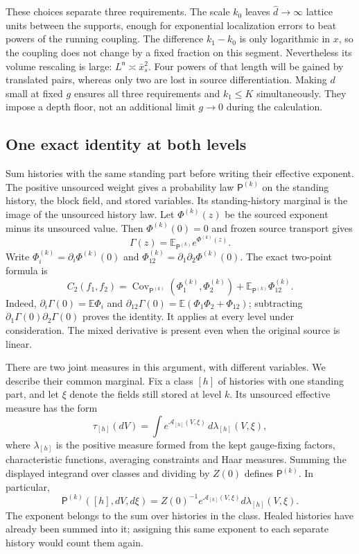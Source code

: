 \documentclass[11pt,letterpaper,reqno]{amsart}
\theoremstyle{definition}
\theoremstyle{remark}
\begin{document}
These choices separate three requirements. The scale $k_0$ leaves
$\hat d\to\infty$ lattice units between the supports, enough for
exponential localization errors to beat powers of the running coupling.
The difference $k_1-k_0$ is only logarithmic in $x$, so the coupling
does not change by a fixed fraction on this segment. Nevertheless its
volume rescaling is large: $L^{\mathsf n}\asymp\bar x_s^2$.
Four powers of that length will be gained by translated pairs, whereas
only two are lost in source differentiation. Making $d$ small at fixed
$g$ ensures all three requirements and $k_1\le K$ simultaneously.
They impose a depth floor, not an additional limit $g\to0$ during
the calculation.

\subsection{One exact identity at both levels}

Sum histories with the same standing part before writing their effective
exponent. The positive unsourced weight gives a probability law
$\mathsf P^{(k)}$ on the standing history, the block field, and stored
variables. Its standing-history marginal is the image of the unsourced
history law. Let $\Phi^{(k)}(z)$ be the sourced exponent minus its
unsourced value. Then $\Phi^{(k)}(0)=0$ and frozen source transport gives
\[
 \Gamma(z)=\mathbb E_{\mathsf P^{(k)}}e^{\Phi^{(k)}(z)}.
\]
Write $\Phi_i^{(k)}=\partial_i\Phi^{(k)}(0)$ and
$\Phi_{12}^{(k)}=\partial_1\partial_2\Phi^{(k)}(0)$.
The exact two-point formula is
\begin{equation}\label{eq:witness-exact-identity}
 C_2(f_1,f_2)
  =\operatorname{Cov}_{\mathsf P^{(k)}}
                   (\Phi_1^{(k)},\Phi_2^{(k)})
       +\mathbb E_{\mathsf P^{(k)}}\Phi_{12}^{(k)}.
\end{equation}
Indeed, $\partial_i\Gamma(0)=\mathbb E\Phi_i$ and
$\partial_{12}\Gamma(0)=\mathbb E(\Phi_1\Phi_2+\Phi_{12})$;
subtracting $\partial_1\Gamma(0)\partial_2\Gamma(0)$ proves the
identity. It applies at every level under consideration. The mixed
derivative is present even when the original source is linear.

There are two joint measures in this argument, with different variables.
We describe their common marginal. Fix a class $[h]$ of histories with
one standing part, and let $\xi$ denote the fields still stored at
level $k$. Its unsourced effective measure has the form
\[
 \tau_{[h]}(dV)=\int e^{\mathcal A_{[h]}(V,\xi)}
                                  \,d\lambda_{[h]}(V,\xi),
\]
where $\lambda_{[h]}$ is the positive measure formed from the kept
gauge-fixing factors, characteristic functions, averaging constraints
and Haar measures. Summing the displayed integrand over classes and
dividing by $Z(0)$ defines $\mathsf P^{(k)}$. In particular,
\[
 \mathsf P^{(k)}([h],dV,d\xi)
       =Z(0)^{-1}e^{\mathcal A_{[h]}(V,\xi)}
                                      d\lambda_{[h]}(V,\xi).
\]
The exponent belongs to the sum over histories in the class. Healed
histories have already been summed into it; assigning this same
exponent to each separate history would count them again.
\end{document}
